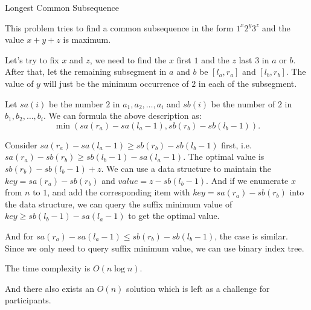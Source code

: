 \begin{tutorial}{Longest Common Subsequence}

This problem tries to find a common subsequence in the form $1^x2^y3^z$ and the value 
 $x+y+z$ is maximum.

Let's try to fix $x$ and $z$, we need to find the $x$ first $1$ and the $z$ last $3$ in $a$ or $b$. After that, let the remaining subsegment in $a$ and $b$ be $[l_a,r_a]$ and $[l_b,r_b]$. The value of $y$ will just be the minimum occurrence of $2$ in each of the subsegment.

Let $sa(i)$ be the number $2$ in $a_1,a_2,\dots,a_i$ and $sb(i)$ be the number of $2$ in $b_1,b_2,\dots,b_i$. We can formula the above description as:
$$
\min(sa(r_a)-sa(l_a-1), sb(r_b)-sb(l_b-1)).
$$

Consider $sa(r_a)-sa(l_a-1) \ge sb(r_b)-sb(l_b-1)$ first, i.e. $sa(r_a)-sb(r_b) \ge sb(l_b-1) - sa(l_a-1)$. The optimal value is $sb(r_b)-sb(l_b-1)+z$. We can use a data structure to maintain the $key=sa(r_a)-sb(r_b)$ and $value=z-sb(l_b-1)$. And if we enumerate $x$ from $n$ to $1$, and add the corresponding item with $key=sa(r_a)-sb(r_b)$ into the data structure, we can query the suffix minimum value of $key \ge sb(l_b-1) - sa(l_a-1)$ to get the optimal value.

And for $sa(r_a)-sa(l_a-1) \le sb(r_b)-sb(l_b-1)$, the case is similar. Since we only need to query suffix minimum value, we can use binary index tree.

The time complexity is $O(n \log n)$. 

And there also exists an $O(n)$ solution which is left as a challenge for participants.

\end{tutorial}

